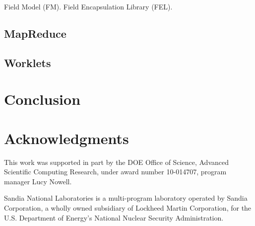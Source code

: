 \documentclass{article}
\begin{document}
Field Model (FM).  Field Encapsulation Library (FEL).

\subsection{MapReduce}
\label{sec:MapReduce}

\subsection{Worklets}
\label{sec:Worklets}


\section{Conclusion}
\label{sec:Conclusion}


\section{Acknowledgments}

This work was supported in part by the DOE Office of Science, Advanced
Scientific Computing Research, under award number 10-014707, program
manager Lucy Nowell.

Sandia National Laboratories is a multi-program laboratory operated by
Sandia Corporation, a wholly owned subsidiary of Lockheed Martin
Corporation, for the U.S. Department of Energy's National Nuclear Security
Administration.



\end{document}
